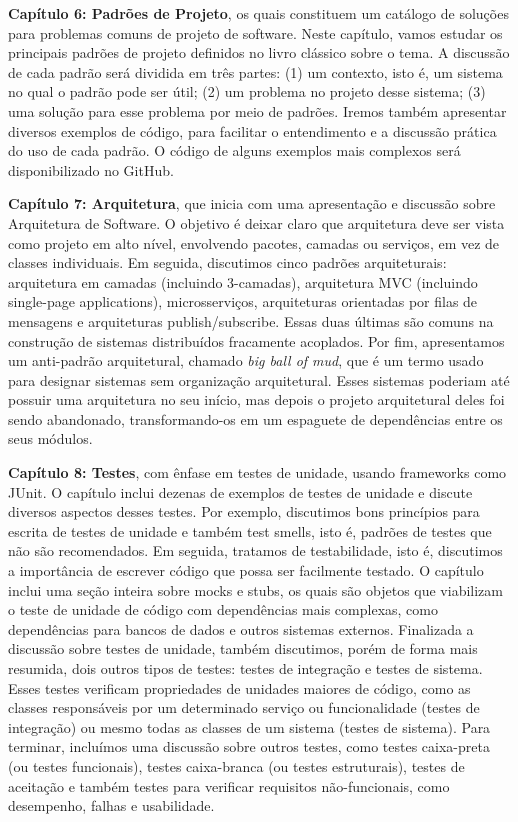 \documentclass[
  11pt,
  twoside]{book}
\begin{document}
\textbf{Capítulo 6: Padrões de Projeto}, os quais constituem um catálogo
de soluções para problemas comuns de projeto de software. Neste
capítulo, vamos estudar os principais padrões de projeto definidos no
livro clássico sobre o tema. A discussão de cada padrão será dividida em
três partes: (1) um contexto, isto é, um sistema no qual o padrão pode
ser útil; (2) um problema no projeto desse sistema; (3) uma solução para
esse problema por meio de padrões. Iremos também apresentar diversos
exemplos de código, para facilitar o entendimento e a discussão prática
do uso de cada padrão. O código de alguns exemplos mais complexos será
disponibilizado no GitHub.

\textbf{Capítulo 7: Arquitetura}, que inicia com uma apresentação e
discussão sobre Arquitetura de Software. O objetivo é deixar claro que
arquitetura deve ser vista como projeto em alto nível, envolvendo
pacotes, camadas ou serviços, em vez de classes individuais. Em seguida,
discutimos cinco padrões arquiteturais: arquitetura em camadas
(incluindo 3-camadas), arquitetura MVC (incluindo single-page
applications), microsserviços, arquiteturas orientadas por filas de
mensagens e arquiteturas publish/subscribe. Essas duas últimas são
comuns na construção de sistemas distribuídos fracamente acoplados. Por
fim, apresentamos um anti-padrão arquitetural, chamado \emph{big ball of
mud}, que é um termo usado para designar sistemas sem organização
arquitetural. Esses sistemas poderiam até possuir uma arquitetura no seu
início, mas depois o projeto arquitetural deles foi sendo abandonado,
transformando-os em um espaguete de dependências entre os seus módulos.

\textbf{Capítulo 8: Testes}, com ênfase em testes de unidade, usando
frameworks como JUnit. O capítulo inclui dezenas de exemplos de testes
de unidade e discute diversos aspectos desses testes. Por exemplo,
discutimos bons princípios para escrita de testes de unidade e também
test smells, isto é, padrões de testes que não são recomendados. Em
seguida, tratamos de testabilidade, isto é, discutimos a importância de
escrever código que possa ser facilmente testado. O capítulo inclui uma
seção inteira sobre mocks e stubs, os quais são objetos que viabilizam o
teste de unidade de código com dependências mais complexas, como
dependências para bancos de dados e outros sistemas externos. Finalizada
a discussão sobre testes de unidade, também discutimos, porém de forma
mais resumida, dois outros tipos de testes: testes de integração e
testes de sistema. Esses testes verificam propriedades de unidades
maiores de código, como as classes responsáveis por um determinado
serviço ou funcionalidade (testes de integração) ou mesmo todas as
classes de um sistema (testes de sistema). Para terminar, incluímos uma
discussão sobre outros testes, como testes caixa-preta (ou testes
funcionais), testes caixa-branca (ou testes estruturais), testes de
aceitação e também testes para verificar requisitos não-funcionais, como
desempenho, falhas e usabilidade.
\end{document}
